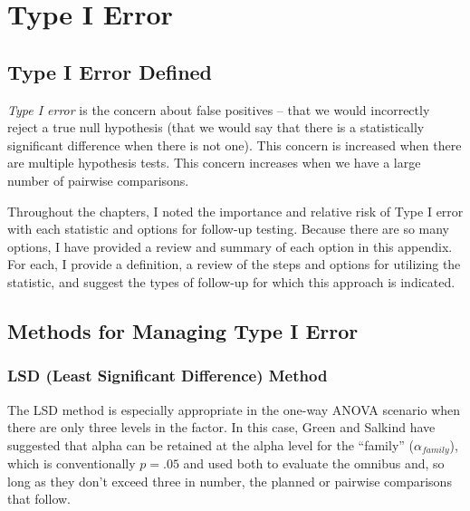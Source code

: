 \documentclass[
  11pt,
]{book}
\begin{document}
\hypertarget{type1}{%
\chapter{Type I Error}\label{type1}}

\hypertarget{type-i-error-defined}{%
\section*{Type I Error Defined}\label{type-i-error-defined}}


\emph{Type I error} is the concern about false positives -- that we would incorrectly reject a true null hypothesis (that we would say that there is a statistically significant difference when there is not one). This concern is increased when there are multiple hypothesis tests. This concern increases when we have a large number of pairwise comparisons.

Throughout the chapters, I noted the importance and relative risk of Type I error with each statistic and options for follow-up testing. Because there are so many options, I have provided a review and summary of each option in this appendix. For each, I provide a definition, a review of the steps and options for utilizing the statistic, and suggest the types of follow-up for which this approach is indicated.

\hypertarget{methods-for-managing-type-i-error}{%
\section*{Methods for Managing Type I Error}\label{methods-for-managing-type-i-error}}


\hypertarget{lsd-least-significant-difference-method}{%
\subsection*{LSD (Least Significant Difference) Method}\label{lsd-least-significant-difference-method}}


The LSD method is especially appropriate in the one-way ANOVA scenario when there are only three levels in the factor. In this case, Green and Salkind \citeyearpar{green_using_2017} have suggested that alpha can be retained at the alpha level for the ``family'' (\(\alpha_{family}\)), which is conventionally \(p = .05\) and used both to evaluate the omnibus and, so long as they don't exceed three in number, the planned or pairwise comparisons that follow.
\end{document}
